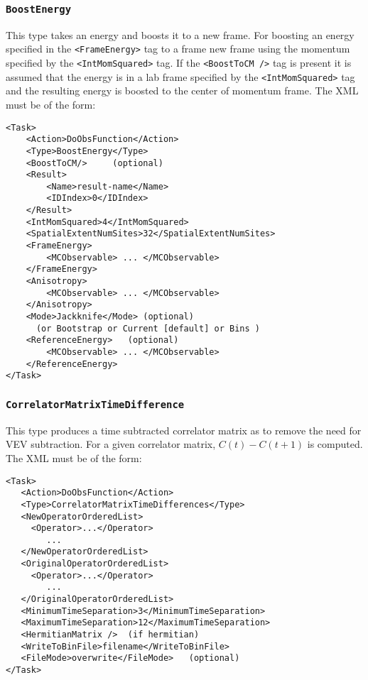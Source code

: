 \documentclass[12pt]{article}
\newcommand{\vb}{\texttt}
\begin{document}
\subsubsection{\vb{BoostEnergy}}
This type takes an energy and boosts it to a new frame.
For boosting an energy specified in the \vb{<FrameEnergy>} tag
to a frame new frame using the momentum specified by the
\vb{<IntMomSquared>} tag. If the \vb{<BoostToCM />} tag is present
it is assumed that the energy is in a lab frame specified by the
\vb{<IntMomSquared>} tag and the resulting energy is boosted to the
center of momentum frame.
The XML must be of the form:
\begin{verbatim}
<Task>
    <Action>DoObsFunction</Action>
    <Type>BoostEnergy</Type>
    <BoostToCM/>     (optional)
    <Result>
        <Name>result-name</Name>
        <IDIndex>0</IDIndex>
    </Result>
    <IntMomSquared>4</IntMomSquared>
    <SpatialExtentNumSites>32</SpatialExtentNumSites>
    <FrameEnergy>
        <MCObservable> ... </MCObservable>
    </FrameEnergy>
    <Anisotropy>
        <MCObservable> ... </MCObservable>
    </Anisotropy>
    <Mode>Jackknife</Mode> (optional)
      (or Bootstrap or Current [default] or Bins )
    <ReferenceEnergy>   (optional)
        <MCObservable> ... </MCObservable>
    </ReferenceEnergy>
</Task>
\end{verbatim}
\subsubsection{\vb{CorrelatorMatrixTimeDifference}}
This type produces a time subtracted
correlator matrix as to remove the need for VEV subtraction. For a given correlator
matrix, $C(t)-C(t+1)$ is computed.
The XML must be of the form:
\begin{verbatim}
<Task>
   <Action>DoObsFunction</Action>
   <Type>CorrelatorMatrixTimeDifferences</Type>
   <NewOperatorOrderedList>
     <Operator>...</Operator>
        ...
   </NewOperatorOrderedList>
   <OriginalOperatorOrderedList>
     <Operator>...</Operator>
        ...
   </OriginalOperatorOrderedList>
   <MinimumTimeSeparation>3</MinimumTimeSeparation>
   <MaximumTimeSeparation>12</MaximumTimeSeparation>
   <HermitianMatrix />  (if hermitian)
   <WriteToBinFile>filename</WriteToBinFile>
   <FileMode>overwrite</FileMode>   (optional)
</Task>
\end{verbatim}
\end{document}

